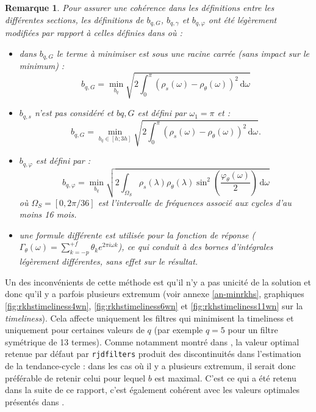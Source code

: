 \documentclass[
  11pt,
  french,
  a4paper]{article}
\newcommand\1{\mathds{1}}
\newcommand\ud{\,\mathrm{d}}
\newtheorem*{remarque}{Remarque}
\begin{document}
\begin{remarque}

Pour assurer une cohérence dans les définitions entre les différentes sections, les définitions de \(b_{q,G}\), \(b_{q,\gamma}\) et \(b_{q,\varphi}\) ont été légèrement modifiées par rapport à celles définies dans \textcite{dagumbianconcini2015new} où :

\begin{itemize}
\item
  dans \(b_{q,G}\) le terme à minimiser est sous une racine carrée (sans impact sur le minimum) :
  \[
  b_{q,G}=\underset{b_q}{\min}\sqrt{
  2\int_{0}^{\pi}
  \left(\rho_s(\omega)-\rho_\theta(\omega)\right)^{2}\ud \omega}
  \]
\item
  \(b_{q,s}\) n'est pas considéré et \(b{q,G}\) est défini par \(\omega_1=\pi\) et :
  \[
  b_{q,G}=\underset{b_q\in[h; 3h]}{\min}
  \sqrt{2\int_{0}^{\pi}
  \left(\rho_s(\omega)-\rho_\theta(\omega)\right)^{2} \ud \omega}.
  \]
\item
  \(b_{q,\varphi}\) est défini par :
  \[
  b_{q,\varphi}=\underset{b_q}{\min}
  \sqrt{2\int_{\Omega_S}
  \rho_s(\lambda)\rho_\theta(\lambda)\sin^{2}\left(\frac{\varphi_\theta(\omega)}{2}\right)\ud \omega}
  \]
  où \(\Omega_S=[0,2\pi/36]\) est l'intervalle de fréquences associé aux cycles d'au moins 16 mois.
\item
  une formule différente est utilisée pour la fonction de réponse (\(\Gamma_\theta(\omega)=\sum_{k=-p}^{+f} \theta_k e^{2\pi i \omega k}\)), ce qui conduit à des bornes d'intégrales légèrement différentes, sans effet sur le résultat.
\end{itemize}

\end{remarque}

Un des inconvénients de cette méthode est qu'il n'y a pas unicité de la solution et donc qu'il y a parfois plusieurs extremum (voir annexe \ref{an-minrkhs}, graphiques \ref{fig:rkhstimeliness4wn}, \ref{fig:rkhstimeliness6wn} et \ref{fig:rkhstimeliness11wn} sur la \emph{timeliness}).
Cela affecte uniquement les filtres qui minimisent la timeliness et uniquement pour certaines valeurs de \(q\) (par exemple \(q=5\) pour un filtre symétrique de 13 termes).
Comme notamment montré dans \textcite{JSM2021AQLTLQ}, la valeur optimal retenue par défaut par \texttt{rjdfilters} produit des discontinuités dans l'estimation de la tendance-cycle : dans les cas où il y a plusieurs extremum, il serait donc préférable de retenir celui pour lequel \(b\) est maximal.
C'est ce qui a été retenu dans la suite de ce rapport, c'est également cohérent avec les valeurs optimales présentés dans \textcite{dagumbianconcini2015new}.
\end{document}
